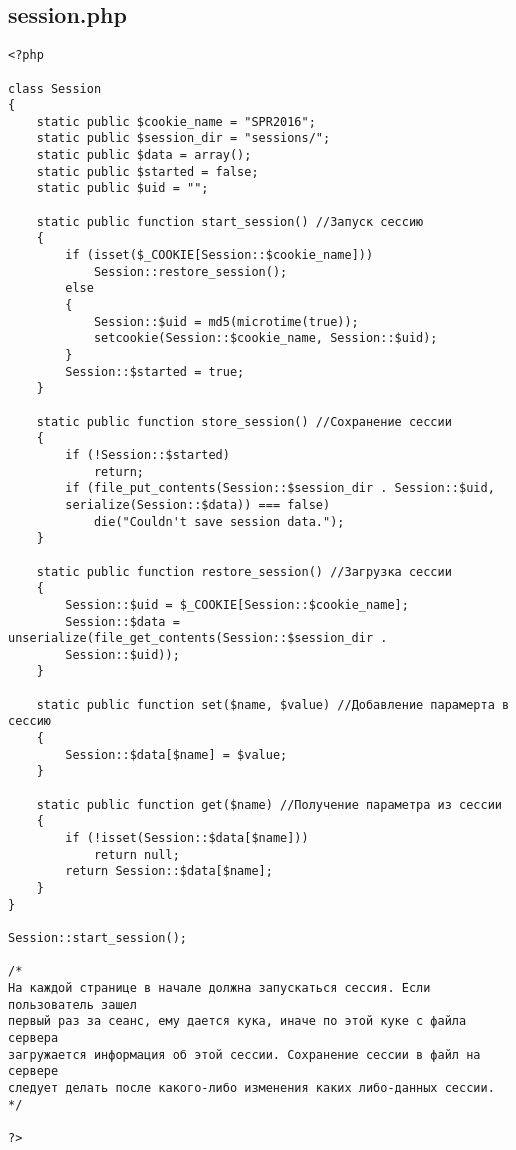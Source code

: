 \documentclass[a4paper]{article}
\begin{document}
\subsection{session.php}
\begin{verbatim}
<?php

class Session
{
    static public $cookie_name = "SPR2016";
    static public $session_dir = "sessions/";
    static public $data = array();
    static public $started = false;
    static public $uid = "";

    static public function start_session() //Запуск сессию
    {
        if (isset($_COOKIE[Session::$cookie_name]))
            Session::restore_session();
        else
        {
            Session::$uid = md5(microtime(true));
            setcookie(Session::$cookie_name, Session::$uid);
        }
        Session::$started = true;
    }

    static public function store_session() //Сохранение сессии
    {
        if (!Session::$started)
            return;
        if (file_put_contents(Session::$session_dir . Session::$uid,
        serialize(Session::$data)) === false)
            die("Couldn't save session data.");
    }

    static public function restore_session() //Загрузка сессии
    {
        Session::$uid = $_COOKIE[Session::$cookie_name];
        Session::$data = unserialize(file_get_contents(Session::$session_dir .
        Session::$uid));
    }

    static public function set($name, $value) //Добавление парамерта в сессию
    {
        Session::$data[$name] = $value;
    }

    static public function get($name) //Получение параметра из сессии
    {
        if (!isset(Session::$data[$name]))
            return null;
        return Session::$data[$name];
    }
}

Session::start_session();

/*
На каждой странице в начале должна запускаться сессия. Если пользователь зашел
первый раз за сеанс, ему дается кука, иначе по этой куке с файла сервера
загружается информация об этой сессии. Сохранение сессии в файл на сервере
следует делать после какого-либо изменения каких либо-данных сессии.
*/

?>
\end{verbatim}
\end{document}
